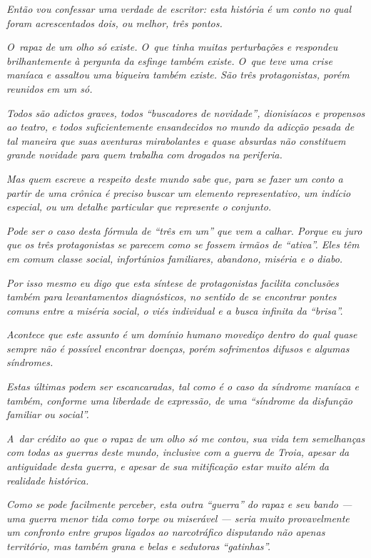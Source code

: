 \emph{Então vou confessar uma verdade de escritor: esta história é um
conto no qual foram acrescentados dois, ou melhor, três pontos.}

\emph{O~rapaz de um olho só existe. O~que tinha muitas perturbações e
respondeu brilhantemente à pergunta da esfinge também existe. O~que teve
uma crise maníaca e assaltou uma biqueira também existe. São três
protagonistas, porém reunidos em um só.}

\emph{Todos são adictos graves, todos ``buscadores de novidade'',
dionisíacos e propensos ao teatro, e todos suficientemente ensandecidos
no mundo da adicção pesada de tal maneira que suas aventuras
mirabolantes e quase absurdas não constituem grande novidade para quem
trabalha com drogados na periferia.}

\emph{Mas quem escreve a respeito deste mundo sabe que, para se fazer um
conto a partir de uma crônica é preciso buscar um elemento
representativo, um indício especial, ou um detalhe particular que
represente o conjunto.}

\emph{Pode ser o caso desta fórmula de ``três em um'' que vem a calhar.
Porque eu juro que os três protagonistas se parecem como se fossem
irmãos de ``ativa''. Eles têm em comum classe social, infortúnios
familiares, abandono, miséria e o diabo.}

\emph{Por isso mesmo eu digo que esta síntese de protagonistas facilita
conclusões também para levantamentos diagnósticos, no sentido de se
encontrar pontes comuns entre a miséria social, o viés individual e a
busca infinita da ``brisa''.}

\emph{Acontece que este assunto é um domínio humano movediço dentro do
qual quase sempre não é possível encontrar doenças, porém sofrimentos
difusos e algumas síndromes.}

\emph{Estas últimas podem ser escancaradas, tal como é o caso da
síndrome maníaca e também, conforme uma liberdade de expressão, de uma
``síndrome da disfunção familiar ou social''.}

\emph{A~dar crédito ao que o rapaz de um olho só me contou, sua vida tem
semelhanças com todas as guerras deste mundo, inclusive com a guerra de
Troia, apesar da antiguidade desta guerra, e apesar de sua mitificação
estar muito além da realidade histórica.}

\emph{Como se pode facilmente perceber, esta outra ``guerra'' do rapaz e
seu bando --- uma guerra menor tida como torpe ou miserável --- seria
muito provavelmente um confronto entre grupos ligados ao narcotráfico
disputando não apenas território, mas também grana e belas e sedutoras
``gatinhas''.}

